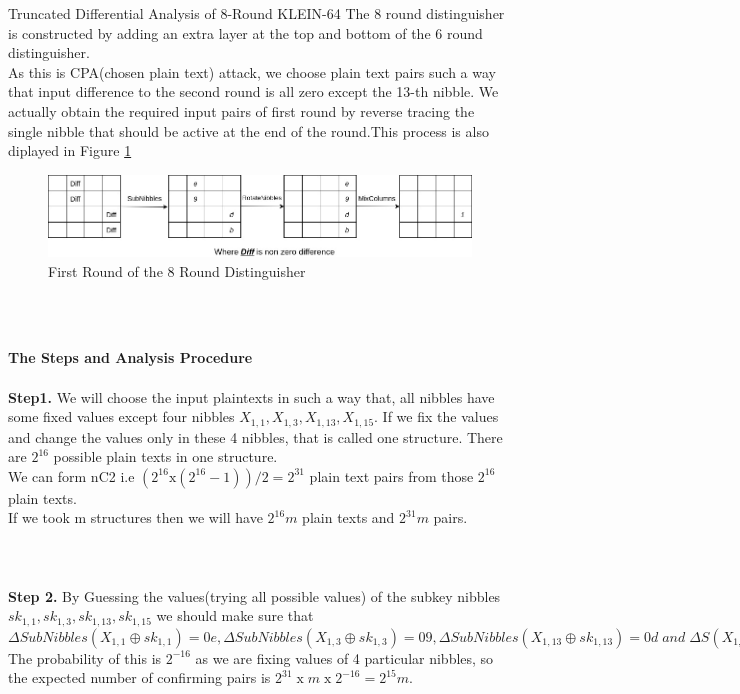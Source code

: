 \begin{frame}{Truncated Differential Analysis of 8-Round KLEIN-64}
The 8 round distinguisher is constructed by adding an extra layer at the top and bottom of the 6 round distinguisher.\\
As this is CPA(chosen plain text) attack, we choose plain text pairs such a way that input difference to the second round is all zero except the 13-th nibble. We actually obtain the required input pairs of first round by reverse tracing the single nibble that should be active at the end of the round.This process is also diplayed in Figure \ref{fig:8distinguisher} \\
\begin{figure}
    \centering
    \includegraphics[width= \textwidth]{images/4to1_diff.jpg}
    \caption{First Round of the 8 Round Distinguisher}
    \label{fig:8distinguisher}
\end{figure}\\ \\
\end{frame}
\begin{frame}
\textbf{ The Steps and Analysis Procedure}\\ \\
\textbf{Step1.} We will choose the input plaintexts in such a way that, all nibbles have some fixed values except four nibbles $X_{1,1} , X_{1,3} , X_{1,13} , X_{1,15}$. If we fix the values and change the values only in these 4 nibbles, that is called one structure. There are $2^{16}$ possible plain texts in one structure.\\
We can form nC2 i.e $(2^{16} \text{x} (2^{16} - 1))/2 = 2^{31}$ plain text pairs from those $2^{16} $ plain texts.\\ If we took m structures then we will have $2^{16}m$ plain texts and $2^{31}m$ pairs.\\ \\ \\ \\
\textbf{Step 2.} By Guessing the values(trying all possible values)  of the subkey nibbles $sk_{1,1} , sk_{1,3} , sk_{1,13} , sk_{1,15}$ we should make sure that $\Delta SubNibbles(X_{1,1} \oplus sk_{1,1} ) = 0e, \Delta SubNibbles(X_{1,3} \oplus sk_{1,3} ) = 09, \Delta SubNibbles(X_{1,13} \oplus sk_{1,13} ) =
0d\; and \;\Delta S(X_{1,15} \oplus sk_{1,15} ) = 0b.$ The probability of this is $2^{-16}$ as we are fixing values of 4 particular nibbles, so the expected number of confirming pairs is $2^{31} \;\text{x}\; m\; \text{x} \;2^{-16} = 2^{15} m$. 

\end{frame}
